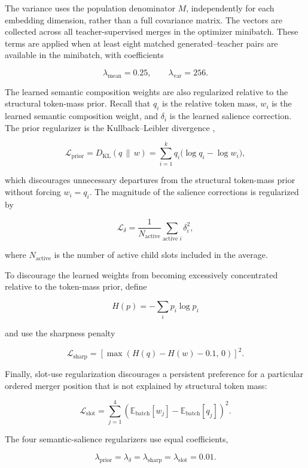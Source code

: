 \documentclass[10pt]{article}
\begin{document}
The variance uses the population denominator \(M\), independently for each
embedding dimension, rather than a full covariance matrix. The vectors are
collected across all teacher-supervised merges in the optimizer minibatch. These terms are applied when at least eight matched generated--teacher pairs are available in the minibatch, with coefficients

\[
\lambda_{\mathrm{mean}}=0.25,
\qquad
\lambda_{\mathrm{var}}=256.
\]

The learned semantic composition weights are also regularized relative to the structural token-mass prior. Recall that \(q_i\) is the relative token mass, \(w_i\) is the learned semantic composition weight, and \(\delta_i\) is the learned salience correction. The prior regularizer is the Kullback--Leibler divergence \citep{kullback-leibler-1951-information},

\[
\mathcal{L}_{\mathrm{prior}}
=
D_{\mathrm{KL}}(q\,\|\,w)
=
\sum_{i=1}^{k}q_i\bigl(\log q_i-\log w_i\bigr),
\]

which discourages unnecessary departures from the structural token-mass prior without forcing \(w_i=q_i\). The magnitude of the salience corrections is regularized by

\[
\mathcal{L}_{\delta}
=
\frac{1}{N_{\mathrm{active}}}
\sum_{\text{active }i}\delta_i^2,
\]

where \(N_{\mathrm{active}}\) is the number of active child slots included in the average.

To discourage the learned weights from becoming excessively concentrated relative to the token-mass prior, define

\[
H(p)=-\sum_i p_i\log p_i
\]

and use the sharpness penalty

\[
\mathcal{L}_{\mathrm{sharp}}
=
\left[
\max\!\left(H(q)-H(w)-0.1,\,0\right)
\right]^2.
\]

Finally, slot-use regularization discourages a persistent preference for a particular ordered merger position that is not explained by structural token mass:

\[
\mathcal{L}_{\mathrm{slot}}
=
\sum_{j=1}^{4}
\left(
\mathbb{E}_{\mathrm{batch}}[w_j]
-
\mathbb{E}_{\mathrm{batch}}[q_j]
\right)^2.
\]

The four semantic-salience regularizers use equal coefficients,

\[
\lambda_{\mathrm{prior}}
=
\lambda_{\delta}
=
\lambda_{\mathrm{sharp}}
=
\lambda_{\mathrm{slot}}
=
0.01.
\]
\end{document}
